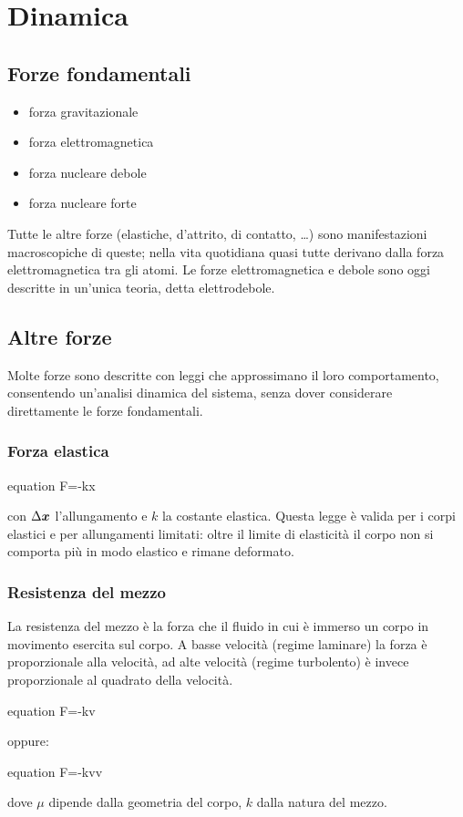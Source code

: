 
\chapter{Dinamica}
\minitoc

\section{Forze fondamentali}
\begin{itemize}
  \item forza gravitazionale
  \item forza elettromagnetica
  \item forza nucleare debole
  \item forza nucleare forte
\end{itemize}
Tutte le altre forze (elastiche, d'attrito, di contatto, \ldots) sono manifestazioni macroscopiche di queste; nella vita quotidiana quasi tutte derivano dalla forza elettromagnetica tra gli atomi. Le forze elettromagnetica e debole sono oggi descritte in un'unica teoria, detta elettrodebole.
\section{Altre forze}
Molte forze sono descritte con leggi che approssimano il loro comportamento, consentendo un'analisi dinamica del sistema, senza dover considerare direttamente le forze fondamentali.

\subsection{Forza elastica}
\begin{legge}[Hooke]
  \begin{eqimp}{equation}
    \ve F=-k\Delta\ve x
  \end{eqimp}


  con $\Delta\boldsymbol{x}$ l'allungamento e $k$ la costante elastica. Questa legge è valida per i corpi elastici e per allungamenti limitati: oltre il limite di elasticità il corpo non si comporta più in modo elastico e rimane deformato.
\end{legge}

\subsection{Resistenza del mezzo}
La resistenza del mezzo è la forza che il fluido in cui è
immerso un corpo in movimento esercita sul corpo. A basse velocità (regime laminare) la forza è
proporzionale alla velocità, ad alte velocità (regime turbolento) è invece proporzionale al
quadrato della velocità.
\begin{eqimp}{equation}
  \ve F=-k\mu \ve v
\end{eqimp}
oppure:
\begin{eqimp}{equation}
  \ve F=-k\mu v\ve v
\end{eqimp}
dove $\mu$ dipende dalla geometria del corpo,
$k$ dalla natura del mezzo.
